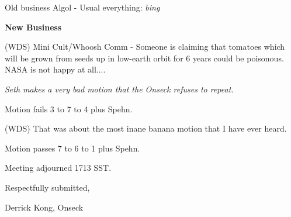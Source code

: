 Old business Algol - Usual everything: {\em bing\/}

\vspace{0.15in}
{\bf New Business}

(WDS) Mini Cult/Whoosh Comm - Someone is claiming that tomatoes which
will be grown from seeds up in low-earth orbit for 6 years could be
poisonous.  NASA is not happy at all....

{\em Seth makes a very bad motion that the Onseck refuses to repeat.}

Motion fails 3 to 7 to 4 plus Spehn.

(WDS) That was about the most inane banana motion that I have ever
heard.

Motion passes 7 to 6 to 1 plus Spehn.

Meeting adjourned 1713 SST.

\vspace{0.15in}
\begin{center}
Respectfully submitted,

Derrick Kong, Onseck
\end{center}

